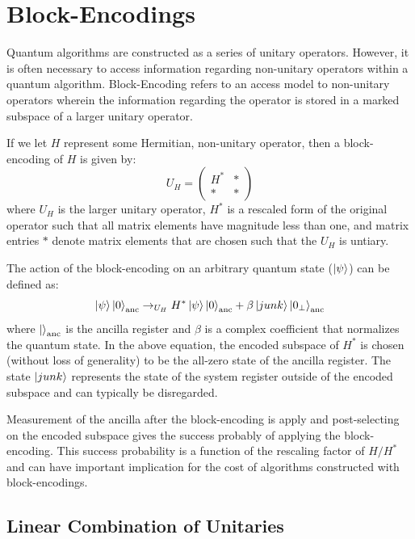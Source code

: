 \section{Block-Encodings}
\label{sec:block-encoding}

Quantum algorithms are constructed as a series of unitary operators.
However, it is often necessary to access information regarding non-unitary operators within a quantum algorithm.
Block-Encoding refers to an access model to non-unitary operators wherein the information regarding the operator is stored in a marked subspace of a larger unitary operator.

If we let $H$ represent some Hermitian, non-unitary operator, then a block-encoding of $H$ is given by:
\begin{equation}
    U_H = 
    \begin{pmatrix}
    H^* & * \\
    * & * 
    \end{pmatrix}
\end{equation}
where $U_H$ is the larger unitary operator, $H^*$ is a rescaled form of the original operator such that all matrix elements have magnitude less than one, and matrix entries $*$ denote matrix elements that are chosen such that the $U_H$ is untiary.

The action of the block-encoding on an arbitrary quantum state ($\ket{\psi}$) can be defined as:
\begin{equation}
    \ket{\psi} \ket{0}_{\text{anc}} \rightarrow_{U_H} H^* \ket{\psi} \ket{0}_{\text{anc}} + \beta \ket{junk} \ket{0_\perp}_{\text{anc}}
\end{equation}
where $\ket{}_{\text{anc}}$ is the ancilla register and $\beta$ is a complex coefficient that normalizes the quantum state.
In the above equation, the encoded subspace of $H^*$ is chosen (without loss of generality) to be the all-zero state of the ancilla register.
The state $\ket{junk}$ represents the state of the system register outside of the encoded subspace and can typically be disregarded.

Measurement of the ancilla after the block-encoding is apply and post-selecting on the encoded subspace gives the success probably of applying the block-encoding.
This success probability is a function of the rescaling factor of $H / H^*$ and can have important implication for the cost of algorithms constructed with block-encodings.  

\subsection{Linear Combination of Unitaries}
\label{subsec:lcu}

